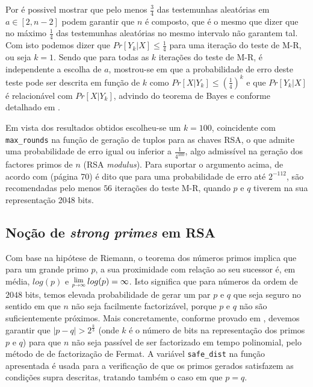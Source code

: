 \documentclass[dvipsnames]{article}
\newcommand{\Lim}[1]{\raisebox{0.5ex}{\scalebox{0.8}{$\displaystyle \lim_{#1}\;$}}}
\begin{document}
\begin{multicols}{2}
  
  \noindent Por \cite{DBLP:journals/dcc/Lenstra00} é possivel mostrar que pelo menos $\frac{3}{4}$ das testemunhas aleatórias em $a \in [2,n-2]$ podem garantir que $n$ é composto, que é o mesmo que dizer que no máximo $\frac{1}{4}$ das testemunhas aleatórias no mesmo intervalo não garantem tal. Com isto podemos dizer que $Pr[Y_k|X] \leq \frac{1}{4}$ para uma iteração do teste de M-R, ou seja $k=1$. Sendo que para todas as $k$ iterações do teste de M-R, é independente a escolha de $a$, mostrou-se em \cite{1204.1657v2} que a probabilidade de erro deste teste pode ser descrita em função de $k$ como $Pr[X|Y_k] \leq (\frac{1}{4})^k$ e que $Pr[Y_k|X]$ é relacionável com $Pr[X|Y_k]$, advindo do teorema de Bayes e conforme detalhado em \cite{1709.09963}.
  
  \vskip 0.4cm
  
  \noindent Em vista dos resultados obtidos escolheu-se um $k=100$, coincidente com \texttt{max\_rounds} na função de geração de tuplos para as chaves RSA, o que admite uma probabilidade de erro igual ou inferior a $\frac{1}{4^{100}}$, algo admissível na geração dos factores primos de $n$ (RSA \textit{modulus}). Para suportar o argumento acima, de acordo com \cite{FIPS} (página 70) é dito que para uma probabilidade de erro até $2^{-112}$, são recomendadas pelo menos $56$ iterações do teste M-R, quando $p$ e $q$ tiverem na sua representação 2048 bits.
  
  \subsection{Noção de \textit{strong primes} em RSA}
  
  Com base na hipótese de Riemann, o teorema dos números primos \cite{rh} implica que para um grande primo $p$, a sua proximidade com relação ao seu sucessor é, em média, $log(p)$ e $\Lim{p \rightarrow \infty}log(p) = \infty$. Isto significa que para números da ordem de $2048$ bits, temos elevada probabilidade de gerar um par $p$ e $q$ que seja seguro no sentido em que $n$ não seja facilmente factorizável, porque $p$ e $q$ não são suficientemente próximos. Mais concretamente, conforme provado em \cite{DBLP:journals/iacr/ErraG09}, devemos garantir que $|p-q| > 2^{\frac{k}{3}}$ (onde $k$ é o número de bits na representação dos primos $p$ e $q$) para que $n$ não seja passível de ser factorizado em tempo polinomial, pelo método de de factorização de Fermat. A variável \texttt{safe\_dist} na função apresentada é usada para a verificação de que os primos gerados satisfazem as condições supra descritas, tratando também o caso em que $p = q$.
  

\end{multicols}
\end{document}
